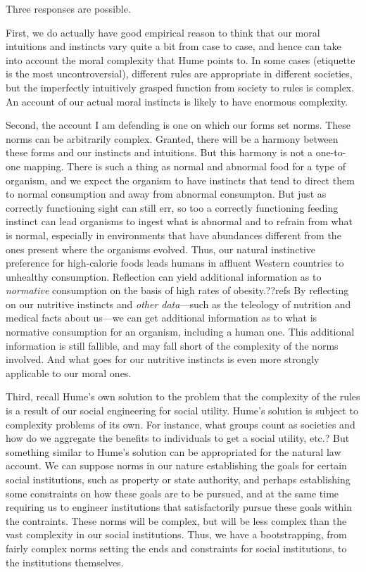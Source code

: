 Three responses are possible. 

First, we do actually have good empirical reason to think that our moral 
intuitions and instincts vary quite a bit from case to case, and hence can take into account the moral
complexity that Hume points to. In some cases (etiquette is the most uncontroversial), different rules are 
appropriate in different societies, but the imperfectly intuitively grasped function from society to rules is 
complex. An account of our actual moral instincts 
is likely to have enormous complexity. 

Second, the account I am defending is one on which our forms set norms. These norms can be arbitrarily complex.
Granted, there will be a harmony between these forms and our instincts and intuitions. But this harmony is not
a one-to-one mapping. There is such a thing as normal and abnormal food for a type of organism, and we expect the organism
to have instincts that tend to direct them to normal consumption and away from abnormal consumpton. But just as correctly
functioning sight can still err, so too a correctly functioning feeding instinct can lead organisms to ingest
what is abnormal and to refrain from what is normal, especially in environments that have abundances different from the
ones present where the organisms evolved. Thus, our natural instinctive
preference for high-calorie foods leads humans in affluent Western countries to unhealthy consumption.
Reflection can yield additional information as to \textit{normative} consumption on the basis of
high rates of obesity.??refs By reflecting on our nutritive instincts and \textit{other data}---such as the teleology of
nutrition and medical facts about us---we can get additional information as to what is normative consumption for
an organism, including a human one. This additional information is still fallible, and may fall short of the complexity
of the norms involved. And what goes for our nutritive instincts is even more strongly applicable to our moral ones.

Third, recall Hume's own solution to the problem that the complexity of the rules is a result of our social engineering for social utility. 
Hume's solution is subject to complexity problems of its own. For
instance, what groups count as societies and how do we aggregate the benefits to individuals to get a social utility, etc.? 
But something similar to Hume's solution can be appropriated for the natural law account. We can suppose norms in our nature 
establishing the goals for certain social institutions, such as property or state authority, and perhaps establishing some 
constraints on how these goals are to be pursued, and at the same time requiring us to engineer institutions that satisfactorily
pursue these goals within the contraints. These norms will be complex, but will be less complex than the vast complexity in
our social institutions. Thus, we have a bootstrapping, from fairly complex norms setting the ends and constraints for social
institutions, to the institutions themselves.

